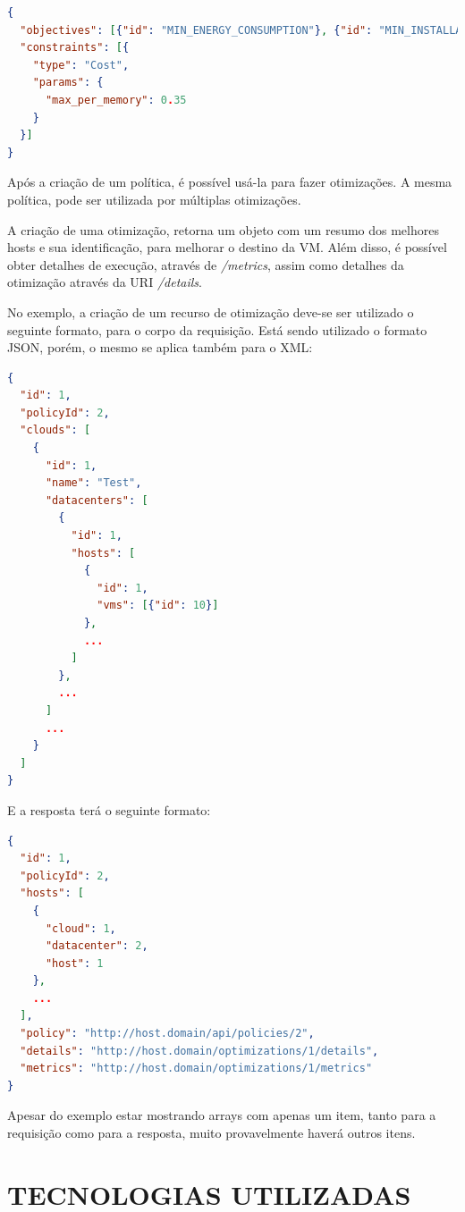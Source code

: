 \begin{lstlisting}[language=json,firstnumber=1]
{
  "objectives": [{"id": "MIN_ENERGY_CONSUMPTION"}, {"id": "MIN_INSTALLATION_TIME"}],
  "constraints": [{
    "type": "Cost",
    "params": {
      "max_per_memory": 0.35
    }
  }]
}
\end{lstlisting}

Após a criação de um política, é possível usá-la para fazer otimizações. A mesma
política, pode ser utilizada por múltiplas otimizações.

A criação de uma otimização, retorna um objeto com um resumo dos melhores hosts
e sua identificação, para melhorar o destino da VM.
Além disso, é possível obter detalhes de execução, através de \textit{/metrics}, assim
como detalhes da otimização através da URI \textit{/details}.

No exemplo, a criação de um recurso de otimização deve-se ser utilizado o seguinte formato, 
para o corpo da requisição. Está sendo utilizado o formato JSON, porém, o mesmo se aplica 
também para o XML:

\begin{lstlisting}[language=json,firstnumber=1]
{
  "id": 1,
  "policyId": 2,
  "clouds": [
    {
      "id": 1,
      "name": "Test",
      "datacenters": [
        {
          "id": 1,
          "hosts": [
            {
              "id": 1,
              "vms": [{"id": 10}]
            },
            ...
          ]
        },
        ...
      ]
      ...
    }
  ]
}
\end{lstlisting}

E a resposta terá o seguinte formato:

\begin{lstlisting}[language=json,firstnumber=1]
{
  "id": 1,
  "policyId": 2,
  "hosts": [
    {
      "cloud": 1,
      "datacenter": 2,
      "host": 1
    }, 
    ...
  ],
  "policy": "http://host.domain/api/policies/2",
  "details": "http://host.domain/optimizations/1/details",
  "metrics": "http://host.domain/optimizations/1/metrics"
}
\end{lstlisting}

Apesar do exemplo estar mostrando arrays com apenas um item,
tanto para a requisição como para a resposta, muito provavelmente 
haverá outros itens.

\section{TECNOLOGIAS UTILIZADAS}

